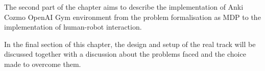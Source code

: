 The second part of the chapter aims to describe the implementation of Anki Cozmo OpenAI Gym environment from the problem formalisation as MDP to the implementation of human-robot interaction.

In the final section of this chapter, the design and setup of the real track will be discussed together with a discussion about the problems faced and the choice made to overcome them.




\begin{figure}
	\centering    
	\scalebox{0.85}{
\begin{tikzpicture}[x=0.75pt,y=0.75pt,yscale=-1,xscale=1]


\end{tikzpicture}}
\end{figure}
